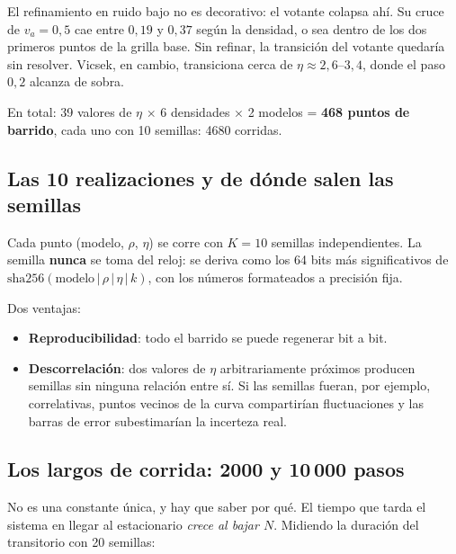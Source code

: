 \documentclass[11pt]{article}
\begin{document}
El refinamiento en ruido bajo no es decorativo: el votante colapsa ahí. Su cruce
de $v_a = 0{,}5$ cae entre $0{,}19$ y $0{,}37$ según la densidad, o sea dentro
de los dos primeros puntos de la grilla base. Sin refinar, la transición del
votante quedaría sin resolver. Vicsek, en cambio, transiciona cerca de
$\eta \approx 2{,}6$--$3{,}4$, donde el paso $0{,}2$ alcanza de sobra.


En total: 39 valores de $\eta$ $\times$ 6 densidades $\times$ 2 modelos =
\textbf{468 puntos de barrido}, cada uno con 10 semillas: 4680 corridas.

\subsection{Las 10 realizaciones y de dónde salen las semillas}

Cada punto (modelo, $\rho$, $\eta$) se corre con $K = 10$ semillas
independientes. La semilla \textbf{nunca} se toma del reloj: se deriva como los
64 bits más significativos de
$\mathrm{sha256}(\text{modelo}\,|\,\rho\,|\,\eta\,|\,k)$, con los números
formateados a precisión fija.

Dos ventajas:

\begin{itemize}
  \item \textbf{Reproducibilidad}: todo el barrido se puede regenerar bit a bit.
  \item \textbf{Descorrelación}: dos valores de $\eta$ arbitrariamente próximos
    producen semillas sin ninguna relación entre sí. Si las semillas fueran, por
    ejemplo, correlativas, puntos vecinos de la curva compartirían fluctuaciones
    y las barras de error subestimarían la incerteza real.
\end{itemize}

\subsection{Los largos de corrida: 2000 y 10\,000 pasos}

No es una constante única, y hay que saber por qué. El tiempo que tarda el
sistema en llegar al estacionario \emph{crece al bajar $N$}. Midiendo la
duración del transitorio con 20 semillas:
\end{document}

